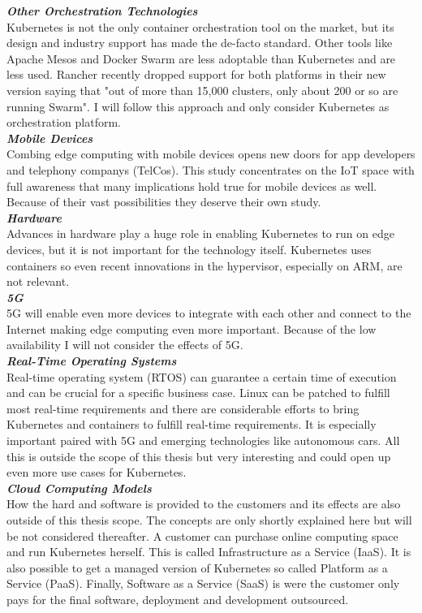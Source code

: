 \textbf{\textit{Other Orchestration Technologies}}\\
Kubernetes is not the only container orchestration tool on the market, but its design and industry support has made the de-facto standard. Other tools like Apache Mesos\cite{ApacheMesos19:online} and Docker Swarm\cite{DockerSwarmmod12:online} are less adoptable than Kubernetes and are less used. Rancher recently dropped support for both platforms in their new version saying that "out of more than 15,000 clusters, only about 200 or so are running Swarm"\cite{FAQ36RancherSwarmMesos:online}. I will follow this approach and only consider Kubernetes as orchestration platform.\\[5mm]
\textbf{\textit{Mobile Devices}}\\
Combing edge computing with mobile devices opens new doors for app developers and telephony companys (TelCos). This study concentrates on the IoT space with full awareness that many implications hold true for mobile devices as well. Because of their vast possibilities they deserve their own study.\\[5mm]
\textbf{\textit{Hardware}}\\
Advances in hardware play a huge role in enabling Kubernetes to run on edge devices, but it is not important for the technology itself. Kubernetes uses containers so even recent innovations in the hypervisor, especially on ARM, are not relevant.\\[5mm]
\textbf{\textit{5G}}\\
5G will enable even more devices to integrate with each other and connect to the Internet making edge computing even more important. Because of the low availability I will not consider the effects of 5G.\\[5mm]
\textbf{\textit{Real-Time Operating Systems}}\\
Real-time operating system (RTOS) can guarantee a certain time of execution and can be crucial for a specific business case. Linux can be patched to fulfill most real-time requirements and there are considerable efforts to bring Kubernetes and containers to fulfill real-time requirements. It is especially important paired with 5G and emerging technologies like autonomous cars\cite{CNCFLaunRTOSKubernetesContainers40:online}. All this is outside the scope of this thesis but very interesting and could open up even more use cases for Kubernetes.\\[5mm]
\textbf{\textit{Cloud Computing Models}}\\
How the hard and software is provided to the customers and its effects are also outside of this thesis scope. The concepts are only shortly explained here but will be not considered thereafter. A customer can purchase online computing space and run Kubernetes herself. This is called Infrastructure as a Service (IaaS). It is also possible to get a managed version of Kubernetes so called Platform as a Service (PaaS). Finally, Software as a Service (SaaS) is were the customer only pays for the final software, deployment and development outsourced.\\[5mm]
